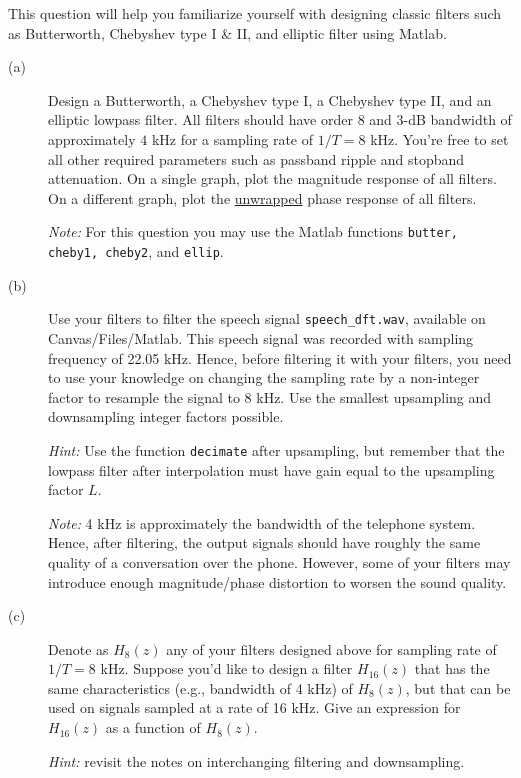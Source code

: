 \documentclass[12pt]{report}
\begin{document}
This question will help you familiarize yourself with designing classic filters such as Butterworth, Chebyshev type I \& II, and elliptic filter using Matlab. 
\begin{description}
	\item[(a)] Design a Butterworth, a Chebyshev type I, a Chebyshev type II, and an elliptic lowpass filter. All filters should have order 8 and 3-dB bandwidth of approximately $4$ kHz for a sampling rate of $1/T = 8$ kHz. You're free to set all other required parameters such as passband ripple and stopband attenuation. On a single graph, plot the magnitude response of all filters. On a different graph, plot the \underline{unwrapped} phase response of all filters.
	
	\textit{Note:} For this question you may use the Matlab functions \texttt{butter, cheby1, cheby2}, and \texttt{ellip}.  
	
	\item[(b)] Use your filters to filter the speech signal \texttt{speech\_dft.wav}, available on Canvas/Files/Matlab. This speech signal was recorded with sampling frequency of 22.05 kHz. Hence, before filtering it with your filters, you need to use your knowledge on changing the sampling rate by a non-integer factor to resample the signal to 8 kHz. Use the smallest upsampling and downsampling integer factors possible.
	 
	\textit{Hint:} Use the function \texttt{decimate} after upsampling, but remember that the lowpass filter after interpolation must have gain equal to the upsampling factor $L$.
	
	\textit{Note:} 4 kHz is approximately the bandwidth of the telephone system. Hence, after filtering, the output signals should have roughly the same quality of a conversation over the phone. However, some of your filters may introduce enough magnitude/phase distortion to worsen the sound quality.
	
	\item[(c)] Denote as $H_8(z)$ any of your filters designed above for sampling rate of $1/T = 8$ kHz. Suppose
	you'd like to design a filter $H_{16}(z)$ that has the same characteristics (e.g., bandwidth of 4 kHz) of $H_8(z)$, but that can be used on signals sampled at a rate of 16 kHz. Give an expression for $H_{16}(z)$ as a function of $H_8(z)$.
	
	\textit{Hint:} revisit the notes on interchanging filtering and downsampling.
\end{description}
\end{document}
